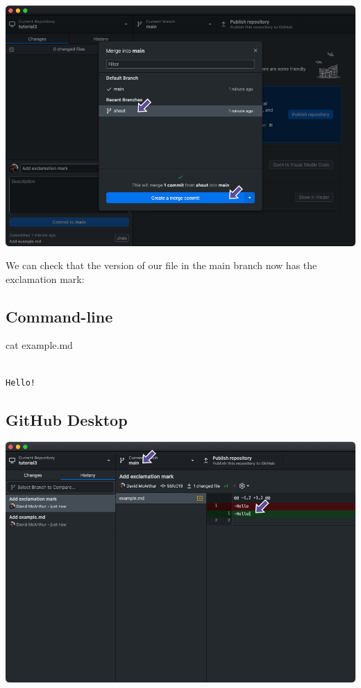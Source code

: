 \documentclass[
  letterpaper,
  DIV=11,
  numbers=noendperiod]{scrartcl}
\newenvironment{Shaded}{\begin{snugshade}}{\end{snugshade}}
\newcommand{\FunctionTok}[1]{\textcolor[rgb]{0.28,0.35,0.67}{#1}}
\newcommand{\NormalTok}[1]{\textcolor[rgb]{0.00,0.23,0.31}{#1}}
\begin{document}
\includegraphics{images/image34.png}

We can check that the version of our file in the main branch now has the
exclamation mark:

\subsection{Command-line}

\begin{Shaded}
\begin{Highlighting}[]
\FunctionTok{cat}\NormalTok{ example.md}
\end{Highlighting}
\end{Shaded}

\begin{verbatim}

Hello!
\end{verbatim}

\subsection{GitHub Desktop}

\includegraphics{images/image35.png}
\end{document}
